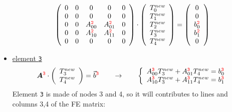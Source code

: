 \begin{itemize}
\[
\left( \begin{array}{ccccc}
0 & 0 & 0 & 0 & 0 \\ 
0 & 0 & 0 & 0 & 0 \\ 
0 & 0 & A_{00}^{{\color{red}\tt 2}} &  A_{01}^{{\color{red}\tt 2}} &0 \\ 
0 & 0 & A_{10}^{{\color{red}\tt 2}} &  A_{11}^{{\color{red}\tt 2}} &0 \\
0 & 0 & 0 & 0 & 0 
\end{array} \right) \cdot
\left(\begin{array}{c}
T_0^{new} \\ T_1^{new} \\ T_2^{new} \\ T_3^{new} \\ T_4^{new}
\end{array} \right)
=
\left(\begin{array}{c}
0 \\ 0 \\ b_{0}^{{\color{red}\tt 2}} \\  b_{1}^{{\color{red}\tt 2}} \\  0  
\end{array}\right)
\]







\item \underline{element {\color{red}\tt 3}} 
\[
{\bm A}^{\color{red} \tt 3}  \cdot 
\left(
\begin{array}{c}
T_3^{new} \\ T_4^{new}
\end{array}
\right)
 =  {\vec b}^{\color{red} \tt 3}
\qquad
\rightarrow
\qquad
\left\{ 
\begin{array}{l}
A_{00}^{{\color{red}\tt 3}} T_3^{new} + A_{01}^{{\color{red}\tt 3}} T_4^{new} = b^{{\color{red}\tt 3}}_0 \\
A_{10}^{{\color{red}\tt 3}} T_3^{new} + A_{11}^{{\color{red}\tt 3}} T_4^{new} = b^{{\color{red}\tt 3}}_1
\end{array}
\right.
\]
Element {\color{red}\tt 3} is made of nodes 3 and 4, so it will contributes to lines and columns 3,4 of the FE matrix:


\end{itemize}

